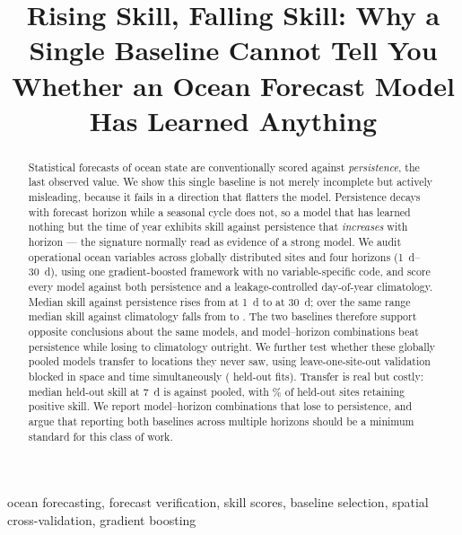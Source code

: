 \documentclass[conference]{IEEEtran}
\begin{document}
\title{Rising Skill, Falling Skill: Why a Single Baseline Cannot Tell You
Whether an Ocean Forecast Model Has Learned Anything}

\author{
}

\maketitle

\begin{abstract}
Statistical forecasts of ocean state are conventionally scored against
\emph{persistence}, the last observed value. We show this single baseline is
not merely incomplete but actively misleading, because it fails in a direction
that flatters the model. Persistence decays with forecast horizon while a
seasonal cycle does not, so a model that has learned nothing but the time of
year exhibits skill against persistence that \emph{increases} with horizon ---
the signature normally read as evidence of a strong model. We audit \NVars{}
operational ocean variables across \NSites{} globally distributed sites and
four horizons (\SIrange{1}{30}{\day}), using one gradient-boosted framework
with no variable-specific code, and score every model against both persistence
and a leakage-controlled day-of-year climatology. Median skill against
persistence rises from \MedSkillPOne{} at \SI{1}{\day} to \MedSkillPThirty{} at
\SI{30}{\day}; over the same range median skill against climatology falls from
\MedSkillCOne{} to \MedSkillCThirty{}. The two baselines therefore support
opposite conclusions about the same models, and \NLoseToClim{} model--horizon
combinations beat persistence while losing to climatology outright. We further
test whether these globally pooled models transfer to locations they never saw,
using leave-one-site-out validation blocked in space and time simultaneously
(\NLosoFits{} held-out fits). Transfer is real but costly: median held-out
skill at \SI{7}{\day} is \MedLosoSeven{} against \MedPooledSeven{} pooled, with
\LosoPositiveShare{}\% of held-out sites retaining positive skill. We report
\NLoseToPers{} model--horizon combinations that lose to persistence, and argue
that reporting both baselines across multiple horizons should be a minimum
standard for this class of work.
\end{abstract}

\begin{IEEEkeywords}
ocean forecasting, forecast verification, skill scores, baseline selection,
spatial cross-validation, gradient boosting
\end{IEEEkeywords}
\end{document}
